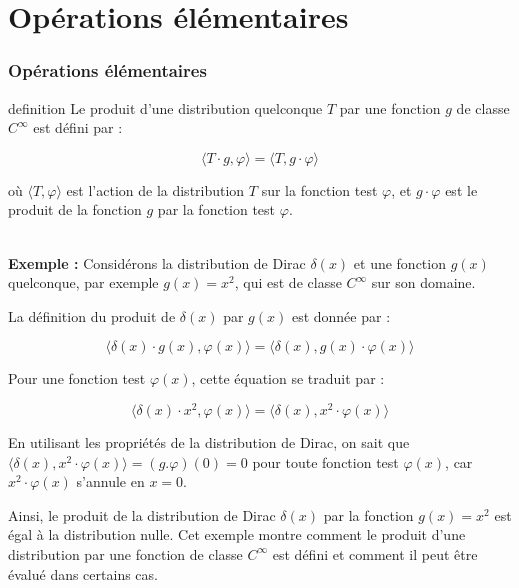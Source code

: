 \documentclass{beamer}
\begin{document}
\section{Opérations élémentaires}
\begin{frame}
\frametitle{Opérations élémentaires}

\begin{block}{definition}
Le produit d'une distribution quelconque \( T \) par une fonction \( g \) de classe \( C^{\infty} \) est défini par :

\[
\langle T \cdot g, \varphi \rangle = \langle T, g \cdot \varphi \rangle
\]

où \( \langle T, \varphi \rangle \) est l'action de la distribution \( T \) sur la fonction test \( \varphi \), et \( g \cdot \varphi \) est le produit de la fonction \( g \) par la fonction test \( \varphi \).

\end{block}
\\
\textbf{Exemple :}
Considérons la distribution de Dirac \( \delta(x) \) et une fonction \( g(x) \) quelconque, par exemple \( g(x) = x^2 \), qui est de classe \( C^{\infty} \) sur son domaine.

La définition du produit de \( \delta(x) \) par \( g(x) \) est donnée par :

\[
\langle \delta(x) \cdot g(x), \varphi(x) \rangle = \langle \delta(x), g(x) \cdot \varphi(x) \rangle
\]
\end{frame}
\begin{frame}
Pour une fonction test \( \varphi(x) \), cette équation se traduit par :

\[
\langle \delta(x) \cdot x^2, \varphi(x) \rangle = \langle \delta(x), x^2 \cdot \varphi(x) \rangle
\]

En utilisant les propriétés de la distribution de Dirac, on sait que \( \langle \delta(x), x^2 \cdot \varphi(x) \rangle = (g.\varphi)(0) = 0 \) pour toute fonction test \( \varphi(x) \), car \( x^2 \cdot \varphi(x) \) s'annule en \( x = 0 \).

Ainsi, le produit de la distribution de Dirac \( \delta(x) \) par la fonction \( g(x) = x^2 \) est égal à la distribution nulle. Cet exemple montre comment le produit d'une distribution par une fonction de classe \( C^{\infty} \) est défini et comment il peut être évalué dans certains cas.
\end{frame}
\end{document}
